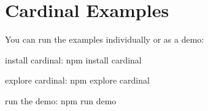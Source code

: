 \chapter{Cardinal Examples}
\hypertarget{md__c_1_2_users_2_s_t_r_i_d_e_r_2source_2repos_2_internal_a_p_i_2_internal_a_p_i_2wwwroot_2lib_2625368aa356a8e15ff70890dbe5b50a7}{}\label{md__c_1_2_users_2_s_t_r_i_d_e_r_2source_2repos_2_internal_a_p_i_2_internal_a_p_i_2wwwroot_2lib_2625368aa356a8e15ff70890dbe5b50a7}
\label{md__c_1_2_users_2_s_t_r_i_d_e_r_2source_2repos_2_internal_a_p_i_2_internal_a_p_i_2wwwroot_2lib_2625368aa356a8e15ff70890dbe5b50a7_autotoc_md1874}%
%
 You can run the examples individually or as a demo\+:


\begin{DoxyItemize}
\item install cardinal\+: {\ttfamily npm install cardinal}
\item explore cardinal\+: {\ttfamily npm explore cardinal}
\item run the demo\+: {\ttfamily npm run demo} 
\end{DoxyItemize}